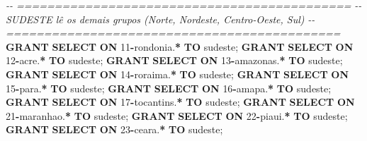 \documentclass[
]{book}
\newenvironment{Shaded}{\begin{snugshade}}{\end{snugshade}}
\newcommand{\CommentTok}[1]{\textcolor[rgb]{0.56,0.35,0.01}{\textit{#1}}}
\newcommand{\DecValTok}[1]{\textcolor[rgb]{0.00,0.00,0.81}{#1}}
\newcommand{\KeywordTok}[1]{\textcolor[rgb]{0.13,0.29,0.53}{\textbf{#1}}}
\newcommand{\NormalTok}[1]{#1}
\newcommand{\OperatorTok}[1]{\textcolor[rgb]{0.81,0.36,0.00}{\textbf{#1}}}
\newcommand{\StringTok}[1]{\textcolor[rgb]{0.31,0.60,0.02}{#1}}
\begin{document}
\begin{Shaded}
\begin{Highlighting}[]
\CommentTok{{-}{-} ============================================}
\CommentTok{{-}{-} SUDESTE lê os demais grupos (Norte, Nordeste, Centro{-}Oeste, Sul)}
\CommentTok{{-}{-} ============================================}
\KeywordTok{GRANT} \KeywordTok{SELECT} \KeywordTok{ON}\NormalTok{ \textasciigrave{}}\DecValTok{11}\OperatorTok{{-}}\NormalTok{rondonia\textasciigrave{}.}\OperatorTok{*}           \KeywordTok{TO} \StringTok{\textquotesingle{}sudeste\textquotesingle{}}\NormalTok{;}
\KeywordTok{GRANT} \KeywordTok{SELECT} \KeywordTok{ON}\NormalTok{ \textasciigrave{}}\DecValTok{12}\OperatorTok{{-}}\NormalTok{acre\textasciigrave{}.}\OperatorTok{*}               \KeywordTok{TO} \StringTok{\textquotesingle{}sudeste\textquotesingle{}}\NormalTok{;}
\KeywordTok{GRANT} \KeywordTok{SELECT} \KeywordTok{ON}\NormalTok{ \textasciigrave{}}\DecValTok{13}\OperatorTok{{-}}\NormalTok{amazonas\textasciigrave{}.}\OperatorTok{*}           \KeywordTok{TO} \StringTok{\textquotesingle{}sudeste\textquotesingle{}}\NormalTok{;}
\KeywordTok{GRANT} \KeywordTok{SELECT} \KeywordTok{ON}\NormalTok{ \textasciigrave{}}\DecValTok{14}\OperatorTok{{-}}\NormalTok{roraima\textasciigrave{}.}\OperatorTok{*}            \KeywordTok{TO} \StringTok{\textquotesingle{}sudeste\textquotesingle{}}\NormalTok{;}
\KeywordTok{GRANT} \KeywordTok{SELECT} \KeywordTok{ON}\NormalTok{ \textasciigrave{}}\DecValTok{15}\OperatorTok{{-}}\NormalTok{para\textasciigrave{}.}\OperatorTok{*}               \KeywordTok{TO} \StringTok{\textquotesingle{}sudeste\textquotesingle{}}\NormalTok{;}
\KeywordTok{GRANT} \KeywordTok{SELECT} \KeywordTok{ON}\NormalTok{ \textasciigrave{}}\DecValTok{16}\OperatorTok{{-}}\NormalTok{amapa\textasciigrave{}.}\OperatorTok{*}              \KeywordTok{TO} \StringTok{\textquotesingle{}sudeste\textquotesingle{}}\NormalTok{;}
\KeywordTok{GRANT} \KeywordTok{SELECT} \KeywordTok{ON}\NormalTok{ \textasciigrave{}}\DecValTok{17}\OperatorTok{{-}}\NormalTok{tocantins\textasciigrave{}.}\OperatorTok{*}          \KeywordTok{TO} \StringTok{\textquotesingle{}sudeste\textquotesingle{}}\NormalTok{;}
\KeywordTok{GRANT} \KeywordTok{SELECT} \KeywordTok{ON}\NormalTok{ \textasciigrave{}}\DecValTok{21}\OperatorTok{{-}}\NormalTok{maranhao\textasciigrave{}.}\OperatorTok{*}           \KeywordTok{TO} \StringTok{\textquotesingle{}sudeste\textquotesingle{}}\NormalTok{;}
\KeywordTok{GRANT} \KeywordTok{SELECT} \KeywordTok{ON}\NormalTok{ \textasciigrave{}}\DecValTok{22}\OperatorTok{{-}}\NormalTok{piaui\textasciigrave{}.}\OperatorTok{*}              \KeywordTok{TO} \StringTok{\textquotesingle{}sudeste\textquotesingle{}}\NormalTok{;}
\KeywordTok{GRANT} \KeywordTok{SELECT} \KeywordTok{ON}\NormalTok{ \textasciigrave{}}\DecValTok{23}\OperatorTok{{-}}\NormalTok{ceara\textasciigrave{}.}\OperatorTok{*}              \KeywordTok{TO} \StringTok{\textquotesingle{}sudeste\textquotesingle{}}\NormalTok{;}

\end{Highlighting}
\end{Shaded}
\end{document}
